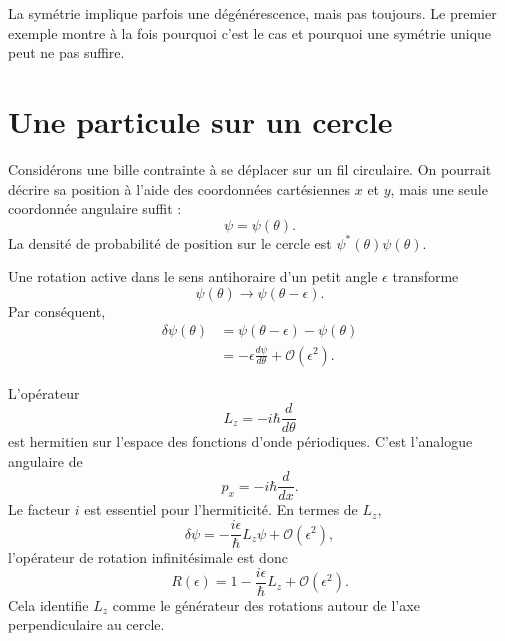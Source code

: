 La symétrie implique parfois une dégénérescence, mais pas toujours. Le premier exemple montre à la fois pourquoi c’est le cas et pourquoi une symétrie unique peut ne pas suffire.

\section{Une particule sur un cercle}

Considérons une bille contrainte à se déplacer sur un fil circulaire. On pourrait décrire sa position à l’aide des coordonnées cartésiennes \(x\) et \(y\), mais une seule coordonnée angulaire suffit :
\begin{equation}
\psi=\psi(\theta).
\end{equation}
La densité de probabilité de position sur le cercle est \(\psi^*(\theta)\psi(\theta)\).

Une rotation active dans le sens antihoraire d’un petit angle \(\epsilon\) transforme
\begin{equation}
\psi(\theta)\longrightarrow\psi(\theta-\epsilon).
\end{equation}
Par conséquent,
\begin{align}
\delta\psi(\theta)
&=\psi(\theta-\epsilon)-\psi(\theta)\\
&=-\epsilon\frac{d\psi}{d\theta}
+\mathcal O(\epsilon^2).
\end{align}

L’opérateur
\begin{equation}
L_z=-i\hbar\frac{d}{d\theta}
\end{equation}
est hermitien sur l’espace des fonctions d’onde périodiques. C’est l’analogue angulaire de
\begin{equation}
p_x=-i\hbar\frac{d}{dx}.
\end{equation}
Le facteur \(i\) est essentiel pour l’hermiticité. En termes de \(L_z\),
\begin{equation}
\delta\psi
=-\frac{i\epsilon}{\hbar}L_z\psi
+\mathcal O(\epsilon^2),
\end{equation}
l’opérateur de rotation infinitésimale est donc
\begin{equation}
R(\epsilon)
=1-\frac{i\epsilon}{\hbar}L_z
+\mathcal O(\epsilon^2).
\end{equation}
Cela identifie \(L_z\) comme le générateur des rotations autour de l’axe perpendiculaire au cercle.

\begin{classroomqa}
\end{classroomqa}

